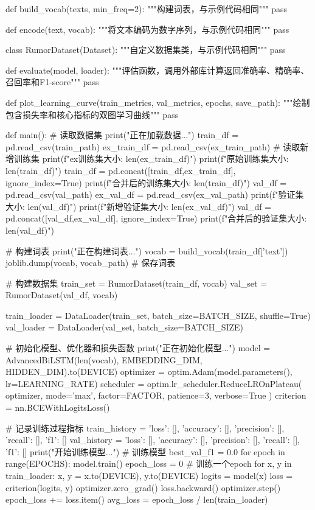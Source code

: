 \begin{codeblock}[language=Python]
def build_vocab(texts, min_freq=2):
    """构建词表，与示例代码相同"""
    pass

def encode(text, vocab):
    """将文本编码为数字序列，与示例代码相同"""
    pass

class RumorDataset(Dataset):
    """自定义数据集类，与示例代码相同"""
    pass
    
def evaluate(model, loader):
    """评估函数，调用外部库计算返回准确率、精确率、召回率和F1-score"""
    pass

def plot_learning_curve(train_metrics, val_metrics, epochs, save_path):
    """绘制包含损失率和核心指标的双图学习曲线"""
    pass

def main():
    # 读取数据集
    print("正在加载数据...")
    train_df = pd.read_csv(train_path)
    ex_train_df = pd.read_csv(ex_train_path)  # 读取新增训练集
    print(f"ex训练集大小: {len(ex_train_df)}")
    print(f"原始训练集大小: {len(train_df)}")
    train_df = pd.concat([train_df,ex_train_df], ignore_index=True)
    print(f"合并后的训练集大小: {len(train_df)}")
    val_df = pd.read_csv(val_path)
    ex_val_df = pd.read_csv(ex_val_path)
    print(f"验证集大小: {len(val_df)}")
    print(f"新增验证集大小: {len(ex_val_df)}")
    val_df = pd.concat([val_df,ex_val_df], ignore_index=True)
    print(f"合并后的验证集大小: {len(val_df)}")

    # 构建词表
    print("正在构建词表...")
    vocab = build_vocab(train_df['text'])
    joblib.dump(vocab, vocab_path)  # 保存词表
    
    # 构建数据集
    train_set = RumorDataset(train_df, vocab)
    val_set = RumorDataset(val_df, vocab)

    train_loader = DataLoader(train_set, batch_size=BATCH_SIZE, shuffle=True)
    val_loader = DataLoader(val_set, batch_size=BATCH_SIZE)

    # 初始化模型、优化器和损失函数
    print("正在初始化模型...")
    model = AdvancedBiLSTM(len(vocab), EMBEDDING_DIM, HIDDEN_DIM).to(DEVICE)
    optimizer = optim.Adam(model.parameters(), lr=LEARNING_RATE)
    scheduler = optim.lr_scheduler.ReduceLROnPlateau(
    optimizer, mode='max', factor=FACTOR, patience=3, verbose=True
    )
    criterion = nn.BCEWithLogitsLoss()

    # 记录训练过程指标
    train_history = {
        'loss': [], 'accuracy': [], 'precision': [], 'recall': [], 'f1': []
    }
    val_history = {
        'loss': [], 'accuracy': [], 'precision': [], 'recall': [], 'f1': []
    }
    print("开始训练模型...")
    # 训练模型
    best_val_f1 = 0.0
    for epoch in range(EPOCHS):
        model.train()
        epoch_loss = 0
        # 训练一个epoch
        for x, y in train_loader:
            x, y = x.to(DEVICE), y.to(DEVICE)
            logits = model(x)
            loss = criterion(logits, y)
            optimizer.zero_grad()
            loss.backward()
            optimizer.step()
            epoch_loss += loss.item()   
        avg_loss = epoch_loss / len(train_loader)


\end{codeblock}
